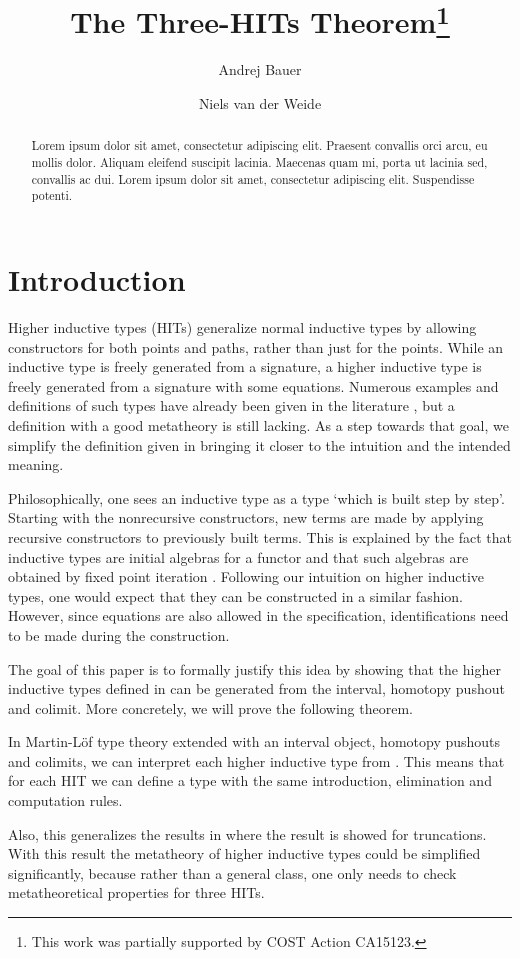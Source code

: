 \documentclass[a4paper,UKenglish]{lipics-v2016}
\title{The Three-HITs Theorem\footnote{This work was partially supported by COST Action CA15123.}}
\author[1]{Andrej Bauer}
\author[2]{Niels van der Weide}
\affil[1]{Department of Mathematics and Physics, University of Ljubljana, Ljubljana, Slovenia\\
  \texttt{Andrej.Bauer@andrej.com}}
\affil[2]{Department of Computer Science, Radboud University, Nijmegen, The Netherlands\\
  \texttt{nweide@cs.ru.nl}}
\begin{document}
\maketitle

\begin{abstract}
Lorem ipsum dolor sit amet, consectetur adipiscing elit. Praesent convallis orci arcu, eu mollis dolor. Aliquam eleifend suscipit lacinia. Maecenas quam mi, porta ut lacinia sed, convallis ac dui. Lorem ipsum dolor sit amet, consectetur adipiscing elit. Suspendisse potenti. 
 \end{abstract}

\section{Introduction}
Higher inductive types (HITs) generalize normal inductive types by allowing constructors for both points and paths, rather than just for the points.
While an inductive type is freely generated from a signature, a higher inductive type is freely generated from a signature with some equations.
Numerous examples and definitions of such types have already been given in the literature \cite{altenkirch2016quotient,awodey2012inductive,basoldhigher,sojakova2015higher,hottbook}, but a definition with a good metatheory is still lacking.
As a step towards that goal, we simplify the definition given in \cite{basoldhigher} bringing it closer to the intuition and the intended meaning.

Philosophically, one sees an inductive type as a type `which is built step by step'.
Starting with the nonrecursive constructors, new terms are made by applying recursive constructors to previously built terms.
This is explained by the fact that inductive types are initial algebras for a functor \cite{dybjer1994inductive,dybjer2003induction} and that such algebras are obtained by fixed point iteration \cite{adamek1974free}.
Following our intuition on higher inductive types, one would expect that they can be constructed in a similar fashion.
However, since equations are also allowed in the specification, identifications need to be made during the construction.

The goal of this paper is to formally justify this idea by showing that the higher inductive types defined in \cite{basoldhigher} can be generated from the interval, homotopy pushout and colimit.
More concretely, we will prove the following theorem.
\begin{theorem}
\label{thm:three-hit}
In Martin-L\"of type theory extended with an interval object, homotopy pushouts and colimits, we can interpret each higher inductive type from \cite{basoldhigher}. 
This means that for each HIT we can define a type with the same introduction, elimination and computation rules.
\end{theorem}
Also, this generalizes the results in \cite{doorn2016constructing,kraus2014general,kraus2016constructions} where the result is showed for truncations.
With this result the metatheory of higher inductive types could be simplified significantly, because rather than a general class, one only needs to check metatheoretical properties for three HITs.
\end{document}
